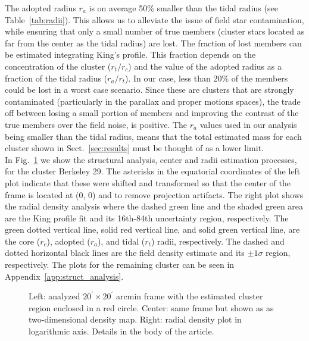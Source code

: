 \documentclass[draft]{aa}
\begin{document}
  The adopted radius $r_{a}$ is on average 50\% smaller than the
  tidal radius (see Table~\ref{tab:radii}). This allows us to alleviate the
  issue of field star contamination, while ensuring that only a small number of
  true members (cluster stars located as far from the center as the tidal
  radius) are lost.
  The fraction of lost members can be estimated integrating King's profile. This
  fraction depends on the concentration of the cluster ($r_{t}/r_{c}$) and the
  value of the adopted radius as a fraction of the tidal radius ($r_{a}/r_{t}$).
  In our case, less than 20\% of the members could be lost in a worst case
  scenario. Since these are clusters that are strongly contaminated 
  (particularly in the parallax and proper motions spaces), the trade off
  between losing a small portion of members and improving the contrast of the
  true members over the field noise, is positive.
  The $r_{a}$ values used in our analysis being smaller than the tidal radius,
  means that the total estimated mass for each cluster shown in
  Sect.~\ref{sec:results} must be thought of as a lower limit.\\

  In Fig.~\ref{fig:BER29_struct} we show the structural analysis, center and
  radii estimation processes, for the cluster Berkeley 29. The asterisks in the
  equatorial coordinates of the left plot indicate that these were shifted
  and transformed so that the center of the frame is located at (0, 0) and to
  remove projection artifacts. The right plot shows the radial density analysis
  where the dashed green line and the shaded green area are the King profile fit
  and its 16th-84th uncertainty region, respectively. The green dotted vertical
  line, solid red vertical line, and solid green vertical line, are the core 
  ($r_{c}$), adopted ($r_{a}$), and tidal ($r_{t}$) radii, respectively. The
  dashed and dotted horizontal black lines are the field density estimate and
  its $\pm1\sigma$ region, respectively. The plots for the remaining cluster can
  be seen in Appendix~\ref{app:struct_analysis}.

  \begin{figure}
   \caption{Left: analyzed $20^{\prime} \times 20^{\prime}$ arcmin frame with the
   estimated cluster region enclosed in a red circle. Center: same frame but
   shown as as two-dimensional density map. Right: radial density plot in
   logarithmic axis. Details in the body of the article.}
   \label{fig:BER29_struct}
  \end{figure}
\end{document}
